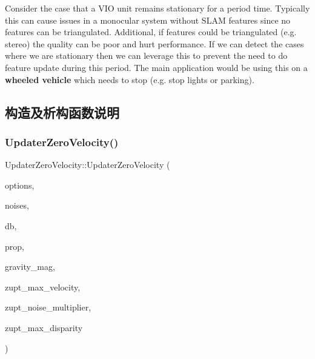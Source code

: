 Consider the case that a V\+IO unit remains stationary for a period time. Typically this can cause issues in a monocular system without S\+L\+AM features since no features can be triangulated. Additional, if features could be triangulated (e.\+g. stereo) the quality can be poor and hurt performance. If we can detect the cases where we are stationary then we can leverage this to prevent the need to do feature update during this period. The main application would be using this on a {\bfseries wheeled vehicle} which needs to stop (e.\+g. stop lights or parking). 

\subsection{构造及析构函数说明}
\mbox{\label{classov__msckf_1_1UpdaterZeroVelocity_a1077d2767c078874ed48132ebaa9b975}} 
\subsubsection{\texorpdfstring{Updater\+Zero\+Velocity()}{UpdaterZeroVelocity()}}
{\footnotesize\ttfamily Updater\+Zero\+Velocity\+::\+Updater\+Zero\+Velocity (\begin{DoxyParamCaption}\item[{\hyperlink{structov__msckf_1_1UpdaterOptions}{Updater\+Options} \&}]{options,  }\item[{\hyperlink{structov__msckf_1_1NoiseManager}{Noise\+Manager} \&}]{noises,  }\item[{std\+::shared\+\_\+ptr$<$ \hyperlink{classov__core_1_1FeatureDatabase}{ov\+\_\+core\+::\+Feature\+Database} $>$}]{db,  }\item[{std\+::shared\+\_\+ptr$<$ \hyperlink{classov__msckf_1_1Propagator}{Propagator} $>$}]{prop,  }\item[{double}]{gravity\+\_\+mag,  }\item[{double}]{zupt\+\_\+max\+\_\+velocity,  }\item[{double}]{zupt\+\_\+noise\+\_\+multiplier,  }\item[{double}]{zupt\+\_\+max\+\_\+disparity }\end{DoxyParamCaption})}



